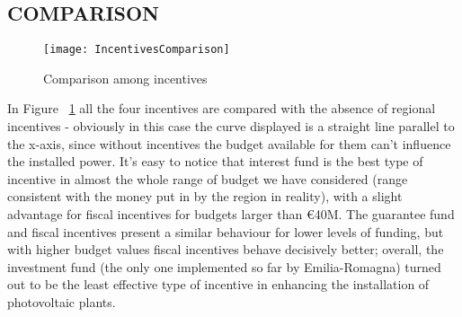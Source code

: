 \documentclass [twocolumn,a4paper,10pt]{ECMS}
\newcommand{\Subsection}[1]{\subsection*{#1}\vspace*{-0.7em}}
\begin{document}



\Subsection{COMPARISON}

\begin{figure}[hbt]
	\centering
	\texttt{[image: IncentivesComparison]}
	\caption{Comparison among incentives}
	\label{IncentivesComparison}
\end{figure}

In Figure ~\ref{IncentivesComparison} all the four incentives are compared with the absence of regional incentives - obviously in this case the curve displayed is a straight line parallel to the x-axis, since without incentives the budget available for them can't influence the installed power. It's easy to notice that interest fund is the best type of incentive in almost the whole range of budget we have considered (range consistent with the money put in by the region in reality), with a slight advantage for fiscal incentives for budgets larger than \euro40M. The guarantee fund and fiscal incentives present a similar behaviour for lower levels of funding, but with higher budget values fiscal incentives behave decisively better; overall, the investment fund (the only one implemented so far by Emilia-Romagna) turned out to be the least effective type of incentive in enhancing the installation of photovoltaic plants.
\end{document}
